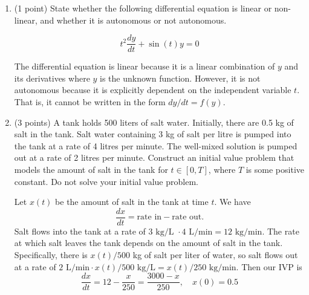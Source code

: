\documentclass[11pt, titlepage]{article}
\begin{document}
\begin{enumerate}
    \pagebreak

    \item (1 point) State whether the following differential equation is linear or non-linear,
    and whether it is autonomous or not autonomous.

    \begin{equation*}
      t^{2} \frac{dy}{dt} + \sin(t)y = 0
    \end{equation*}

    \begin{solution}
      The differential equation is linear because it is a linear combination of \(y\) and its derivatives where \(y\) is the unknown function.
      However, it is not autonomous because it is explicitly dependent on the independent variable \(t\).
      That is, it cannot be written in the form \(dy/dt = f(y)\).
    \end{solution}

    \pagebreak

    \item (3 points) A tank holds 500 liters of salt water.
    Initially, there are 0.5 kg of salt in the tank.
    Salt water containing 3 kg of salt per litre is pumped into the tank at a rate of 4 litres per minute.
    The well-mixed solution is pumped out at a rate of 2 litres per minute.
    Construct an initial value problem that models the amount of salt in the tank for \(t \in [0, T]\), where \(T\) is some positive constant.
    Do not solve your initial value problem.

    \begin{solution}
      Let \(x(t)\) be the amount of salt in the tank at time \(t\).
      We have
      \begin{equation*}
        \frac{dx}{dt} = \text{rate in} - \text{rate out.}
      \end{equation*}
    Salt flows into the tank at a rate of \(3 \text{ kg/L } \cdot 4 \text{ L/min} = 12 \text{ kg/min}\).
    The rate at which salt leaves the tank depends on the amount of salt in the tank.
    Specifically, there is \(x(t) / 500\) kg of salt per liter of water,
    so salt flows out at a rate of \(2 \text{ L/min} \cdot x(t) / 500 \text{ kg/L} = x(t) / 250 \text{ kg/min}\).
    Then our IVP is
    \begin{equation*}
      \frac{dx}{dt} = 12 - \frac{x}{250} = \frac{3000 - x}{250}, \quad x(0) = 0.5
    \end{equation*}
    \end{solution}
    \pagebreak


\end{enumerate}
\end{document}

